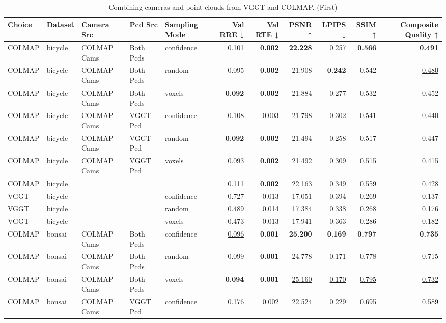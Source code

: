 \begin{table}[H]
\caption{Combining cameras and point clouds from VGGT and COLMAP. (First)}
\label{tab:07_combined_single_first}
\centering
\scriptsize
\begin{tabular}{lllllrrrrrr}
\toprule
Choice & Dataset & Camera Src & Pcd Src & Sampling Mode & Val RRE ↓ & Val RTE ↓ & PSNR ↑ & LPIPS ↓ & SSIM ↑ & Composite Quality ↑ \\
\midrule
COLMAP & bicycle & COLMAP Cams & Both Pcds & confidence & 0.101 & \textbf{0.002} & \textbf{22.228} & \underline{0.257} & \textbf{0.566} & \textbf{0.491} \\
COLMAP & bicycle & COLMAP Cams & Both Pcds & random & 0.095 & \textbf{0.002} & 21.908 & \textbf{0.242} & 0.542 & \underline{0.480} \\
COLMAP & bicycle & COLMAP Cams & Both Pcds & voxels & \textbf{0.092} & \textbf{0.002} & 21.884 & 0.277 & 0.532 & 0.452 \\
COLMAP & bicycle & COLMAP Cams & VGGT Pcd & confidence & 0.108 & \underline{0.003} & 21.798 & 0.302 & 0.541 & 0.440 \\
COLMAP & bicycle & COLMAP Cams & VGGT Pcd & random & \textbf{0.092} & \textbf{0.002} & 21.494 & 0.258 & 0.517 & 0.447 \\
COLMAP & bicycle & COLMAP Cams & VGGT Pcd & voxels & \underline{0.093} & \textbf{0.002} & 21.492 & 0.309 & 0.515 & 0.415 \\
COLMAP & bicycle &  &  &  & 0.111 & \textbf{0.002} & \underline{22.163} & 0.349 & \underline{0.559} & 0.428 \\
VGGT & bicycle &  &  & confidence & 0.727 & 0.013 & 17.051 & 0.394 & 0.269 & 0.137 \\
VGGT & bicycle &  &  & random & 0.489 & 0.014 & 17.384 & 0.338 & 0.268 & 0.176 \\
VGGT & bicycle &  &  & voxels & 0.473 & 0.013 & 17.941 & 0.363 & 0.286 & 0.182 \\
\midrule
COLMAP & bonsai & COLMAP Cams & Both Pcds & confidence & \underline{0.096} & \textbf{0.001} & \textbf{25.200} & \textbf{0.169} & \textbf{0.797} & \textbf{0.735} \\
COLMAP & bonsai & COLMAP Cams & Both Pcds & random & 0.099 & \textbf{0.001} & 24.778 & 0.171 & 0.778 & 0.715 \\
COLMAP & bonsai & COLMAP Cams & Both Pcds & voxels & \textbf{0.094} & \textbf{0.001} & \underline{25.160} & \underline{0.170} & \underline{0.795} & \underline{0.732} \\
COLMAP & bonsai & COLMAP Cams & VGGT Pcd & confidence & 0.176 & \underline{0.002} & 22.524 & 0.229 & 0.695 & 0.589 \\

\end{tabular}
\end{table}

